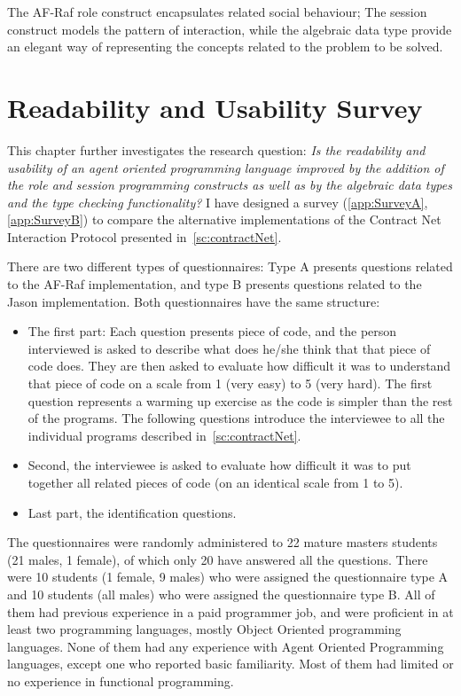 \documentclass[a4paper,12pt,oneside,fleqn]{book} %
\begin{document}
{The AF-Raf role construct encapsulates related social behaviour; The
session construct models the pattern of interaction, while the algebraic
data type provide an elegant way of representing the concepts related to
the problem to be solved. 
\chapter{Readability and Usability Survey}\label{ch:survey} %

This chapter further investigates the research question:
\textit{Is the readability and usability of an agent oriented programming
  language improved by the addition of the role and session programming
  constructs as well as by the algebraic data types and the type checking
functionality?} I have designed a survey (\autoref{app:SurveyA},
\autoref{app:SurveyB}) to compare the
alternative implementations of the Contract Net Interaction Protocol
presented in~\autoref{sc:contractNet}.

There are two different types of questionnaires: Type A presents questions
related to the AF-Raf implementation, and type B presents questions related
to the Jason implementation. Both questionnaires have the same structure:

\begin{itemize}
    \item The first part: Each question presents piece of code, and the
      person interviewed is asked to describe what does he/she think that
      that piece of code does. They are then  asked to evaluate how
      difficult it was to understand that piece of code on a scale from 1
      (very easy) to 5 (very hard). The first question represents a warming
      up exercise as the code is simpler than the rest of the programs. The
      following questions introduce the interviewee to all the individual
      programs described in~\autoref{sc:contractNet}.

    \item Second, the interviewee is asked to evaluate how difficult
      it was to put together all related pieces of code (on an identical
      scale from 1 to 5).

    \item Last part, the identification questions.

\end{itemize}

The questionnaires were randomly administered to 22 mature masters
students (21 males, 1 female), of which only 20 have answered all the
questions. There were 10 students (1 female, 9 males) who were assigned the
questionnaire type A and 10 students (all males) who were assigned
the questionnaire type B. All of them had previous experience in a paid
programmer job, and were proficient in at least two programming languages,
mostly Object Oriented programming languages. None of them had any
experience with Agent Oriented Programming languages, except one who
reported basic familiarity. Most of them had limited or no experience in
functional programming.

}
\end{document}
